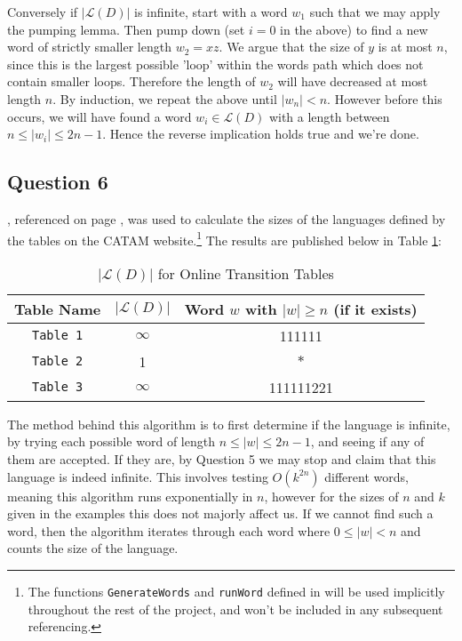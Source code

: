 \documentclass[10pt,a4paper,notitlepage]{article}
\newcommand{\abs}[1]{\lvert#1\rvert}
\begin{document}
Conversely if $\abs{\mathcal{L}(D)}$ is infinite, start with a word $w_{1}$ such that we may apply the pumping lemma. Then pump down (set $i=0$ in the above) to find a new word of strictly smaller length $w_{2}=xz$. We argue that the size of $y$ is at most $n$, since this is the largest possible 'loop' within the words path which does not contain smaller loops. Therefore the length of $w_{2}$ will have decreased at most length $n$. By induction, we repeat the above until $\abs{w_{n}}<n$. However before this occurs, we will have found a word $w_{i}\in \mathcal{L}(D)$ with a length between $n\leq \abs{w_{i}}\leq 2n-1$. Hence the reverse implication holds true and we're done.

\subsection*{\centering Question 6}
, referenced on page \pageref{cd:6}, was used to calculate the sizes of the languages defined by the tables on the CATAM website.\footnote{The functions \texttt{GenerateWords} and \texttt{runWord} defined in  will be used implicitly throughout the rest of the project, and won't be included in any subsequent referencing.} The results are published below in Table \ref{tb:2}:
\begin{table}[H]
\centering
\begin{tabular}{c|c|c}
Table Name & $\abs{\mathcal{L}(D)}$ & Word $w$ with $\abs{w}\geq n$ (if it exists) \\ \hline
\texttt{Table 1} & $\infty$ & 111111\\
\texttt{Table 2} & 1 & $\ast$\\
\texttt{Table 3} & $\infty$ & 111111221\\
\end{tabular}
\caption{$\abs{\mathcal{L}(D)}$ for Online Transition Tables}\label{tb:2}
\end{table}
The method behind this algorithm is to first determine if the language is infinite, by trying each possible word of length $n\leq \abs{w}\leq 2n-1$, and seeing if any of them are accepted. If they are, by Question 5 we may stop and claim that this language is indeed infinite. This involves testing $O(k^{2n})$ different words, meaning this algorithm runs exponentially in $n$, however for the sizes of $n$ and $k$ given in the examples this does not majorly affect us. If we cannot find such a word, then the algorithm iterates through each word where $0\leq \abs{w} <n$ and counts the size of the language. 
\end{document}
